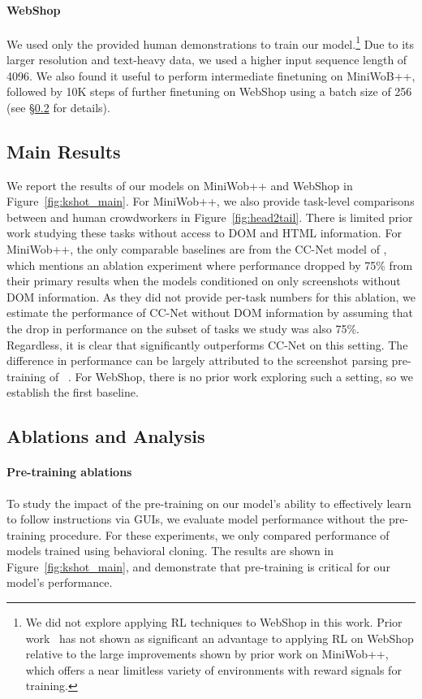 \paragraph{WebShop} We used only the provided human demonstrations to train our model.\footnote{We did not explore applying RL techniques to WebShop in this work. Prior work~\citep{yao2022webshop} has not shown as significant an advantage to applying RL on WebShop relative to the large improvements shown by prior work on MiniWob++, which offers a near limitless variety of environments with reward signals for training.} Due to its larger resolution and text-heavy data, we used a higher input sequence length of 4096. We also found it useful to perform intermediate finetuning on MiniWoB++, followed by 10K steps of further finetuning on WebShop using a batch size of 256 (see \S\ref{sec:ablations} for details). 



\subsection{Main Results}
\label{sec:main-results} We report the results of our models on MiniWob++ and WebShop in Figure~\ref{fig:kshot_main}. For MiniWob++, we also provide task-level comparisons between \ours and human crowdworkers in Figure~\ref{fig:head2tail}. There is limited prior work studying these tasks without access to DOM and HTML information. For MiniWob++, the only comparable baselines are from the CC-Net model of \citet{humphreys2022data}, which mentions an ablation experiment where performance dropped by 75\% from their primary results when the models conditioned on only screenshots without DOM information. As they did not provide per-task numbers for this ablation, we estimate the performance of CC-Net without DOM information by assuming that the drop in performance on the subset of tasks we study was also 75\%. Regardless, it is clear that \ours significantly outperforms CC-Net on this setting. The difference in performance can be largely attributed to the screenshot parsing pre-training of ~\citet{lee2022pix2struct}. For WebShop, there is no prior work exploring such a setting, so we establish the first baseline. 

\subsection{Ablations and Analysis}
\label{sec:ablations}
\paragraph{Pre-training ablations} To study the impact of the pre-training on our model's ability to effectively learn to follow instructions via GUIs, we evaluate model performance without the pre-training procedure. For these experiments, we only compared performance of models trained using behavioral cloning. The results are shown in Figure~\ref{fig:kshot_main}, and demonstrate that pre-training is critical for our model's performance.

